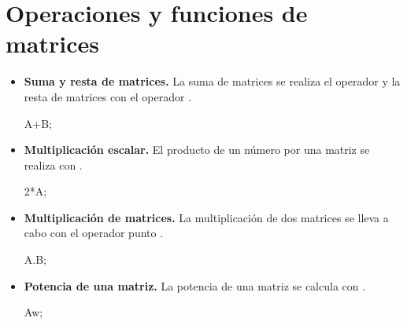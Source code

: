 
\section{Operaciones y funciones de matrices}

\begin{itemize}
 \item \textbf{Suma y resta de matrices.} La suma de matrices se
  realiza el operador \maximain{+} y la resta de matrices con el
  operador \maximain{-}.
  \begin{maximai}
   A+B;
  \end{maximai}
 \item \textbf{Multiplicación escalar.} El producto de un número por
  una matriz se realiza con \maximain{*}.
  \begin{maximai}
   2*A;
  \end{maximai}
 \item \textbf{Multiplicación de matrices.} La multiplicación de dos
  matrices se lleva a cabo con el operador punto .
  \begin{maximai}
   A.B;
  \end{maximai}
 \item \textbf{Potencia de una matriz.} La potencia de una matriz
  se calcula con \maximain{\^}\maximain{\^}.
  \begin{maximai}
   A^^7;
  \end{maximai}\begin{maximao}
   \ifx\endpmatrix\undefined{}
\end{maximao}
\end{itemize}
